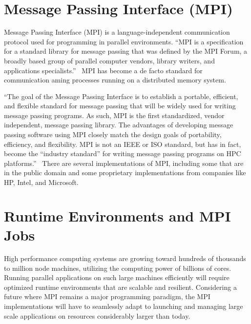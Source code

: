 \section{Message Passing Interface (MPI)}
Message Passing Interface (MPI) is a language-independent communication protocol used for programming in parallel environments. ``MPI is a specification for a standard library for message passing that was defined by the MPI Forum, a broadly based group of parallel computer vendors, library writers, and applications specialists.''~\cite{gropp1996high} MPI has become a de facto standard for communication aming processes running on a distributed memory system.

``The goal of the Message Passing Interface is to establish a portable, efficient, and flexible standard for message passing that will be widely used for writing message passing programs. As such, MPI is the first standardized, vendor independent, message passing library. The advantages of developing message passing software using MPI closely match the design goals of portability, efficiency, and flexibility. MPI is not an IEEE or ISO standard, but has in fact, become the ``industry standard'' for writing message passing programs on HPC platforms.''~\cite{barker2015message} There are several implementations of MPI, including some that are in the public domain and some proprietary implementations from companies like HP, Intel, and Microsoft.


\section{Runtime Environments and MPI Jobs}
High performance computing systems are growing toward hundreds of thousands to million node machines, utilizing the computing power of billions of cores. Running parallel applications on such large machines efficiently will require optimized runtime environments that are scalable and resilient. Considering a future where MPI remains a major programming paradigm, the MPI implementations will have to seamlessly adapt to launching and managing large scale applications on resources considerably larger than today.~\cite{bosilca2011scalability}

